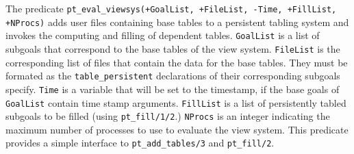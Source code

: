 \begin{description}
%
The predicate {\tt pt\_eval\_viewsys(+GoalList, +FileList, -Time,
  +FillList, +NProcs)} adds user files containing base tables to a
persistent tabling system and invokes the computing and filling of
dependent tables.  {\tt GoalList} is a list of subgoals that
correspond to the base tables of the view system. {\tt FileList} is
the corresponding list of files that contain the data for the base
tables.  They must be formated as the {\tt table\_persistent}
declarations of their corresponding subgoals specify.  {\tt Time} is a
variable that will be set to the timestamp, if the base goals of {\tt
  GoalList} contain time stamp arguments.  {\tt FillList} is a list of
persistently tabled subgoals to be filled (using {\tt pt\_fill/1/2}.)
{\tt NProcs} is an integer indicating the maximum number of processes
to use to evaluate the view system.  This predicate provides a simple
interface to {\tt pt\_add\_tables/3} and {\tt pt\_fill/2}.

\end{description}
